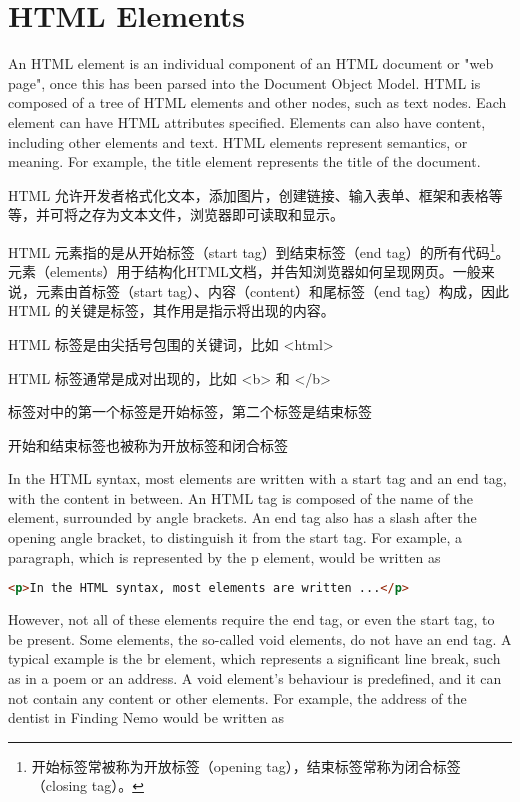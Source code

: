 \part{HTML Elements}

An HTML element is an individual component of an HTML document or "web page", once this has been parsed into the Document Object Model. HTML is composed of a tree of HTML elements and other nodes, such as text nodes. Each element can have HTML attributes specified. Elements can also have content, including other elements and text. HTML elements represent semantics, or meaning. For example, the title element represents the title of the document.

HTML 允许开发者格式化文本，添加图片，创建链接、输入表单、框架和表格等等，并可将之存为文本文件，浏览器即可读取和显示。

HTML 元素指的是从开始标签（start tag）到结束标签（end tag）的所有代码\footnote{开始标签常被称为开放标签（opening tag），结束标签常称为闭合标签（closing tag）。}。元素（elements）用于结构化HTML文档，并告知浏览器如何呈现网页。一般来说，元素由首标签（start tag）、内容（content）和尾标签（end tag）构成，因此HTML 的关键是标签，其作用是指示将出现的内容。




\begin{compactitem}
\item HTML 标签是由尖括号包围的关键词，比如 <html>
\item HTML 标签通常是成对出现的，比如 <b> 和 </b>
\item 标签对中的第一个标签是开始标签，第二个标签是结束标签
\item 开始和结束标签也被称为开放标签和闭合标签
\end{compactitem}




In the HTML syntax, most elements are written with a start tag and an end tag, with the content in between. An HTML tag is composed of the name of the element, surrounded by angle brackets. An end tag also has a slash after the opening angle bracket, to distinguish it from the start tag. For example, a paragraph, which is represented by the p element, would be written as

\begin{lstlisting}[language=HTML]
<p>In the HTML syntax, most elements are written ...</p>
\end{lstlisting}


However, not all of these elements require the end tag, or even the start tag, to be present. Some elements, the so-called void elements, do not have an end tag. A typical example is the br element, which represents a significant line break, such as in a poem or an address. A void element's behaviour is predefined, and it can not contain any content or other elements. For example, the address of the dentist in Finding Nemo would be written as


